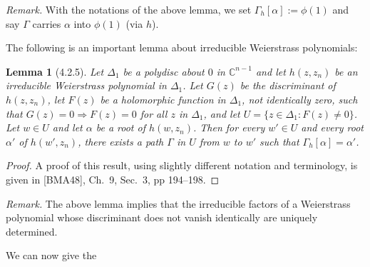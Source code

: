 \documentclass[11pt]{article}
\theoremstyle{plain}
\newtheorem*{lemma*}{Lemma}
\theoremstyle{definition}
\newcommand{\C}{\mathbb{C}}
\begin{document}
\textit{Remark.} With the notations of the above lemma, we set
$\Gamma_h[\alpha] := \phi(1)$ and say $\Gamma$ carries $\alpha$ into
$\phi(1)$ (via $h$).

The following is an important lemma about irreducible Weierstrass
polynomials:

\begin{lemma*}[4.2.5]
Let $\Delta_1$ be a polydisc about $0$ in $\C^{n-1}$ and let
$h(z, z_n)$ be an irreducible Weierstrass polynomial in $\Delta_1$.
Let $G(z)$ be the discriminant of $h(z, z_n)$, let $F(z)$ be a
holomorphic function in $\Delta_1$, not identically zero, such that
$G(z) = 0 \Rightarrow F(z) = 0$ for all $z$ in $\Delta_1$, and let
$U = \{ z \in \Delta_1 : F(z) \ne 0 \}$. Let $w \in U$ and let
$\alpha$ be a root of $h(w, z_n)$. Then for every $w' \in U$ and
every root $\alpha'$ of $h(w', z_n)$, there exists a path $\Gamma$ in
$U$ from $w$ to $w'$ such that $\Gamma_h[\alpha] = \alpha'$.
\end{lemma*}

\begin{proof}
A proof of this result, using slightly different notation and
terminology, is given in [BMA48], Ch.~9, Sec.~3, pp 194--198.
\end{proof}

\textit{Remark.} The above lemma implies that the irreducible factors
of a Weierstrass polynomial whose discriminant does not vanish
identically are uniquely determined.

We can now give the
\end{document}
